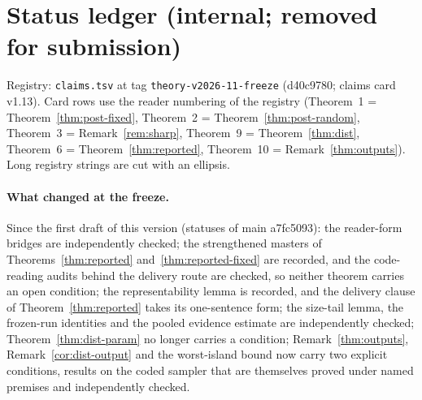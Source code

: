 \ifshowstatus
\section{Status ledger (internal; removed for submission)}\label{app:status}

Registry: \texttt{claims.tsv} at tag \texttt{theory-v2026-11-freeze} (d40c9780; claims card v1.13). Card rows use the
reader numbering of the registry (Theorem~1 = Theorem~\ref{thm:post-fixed}, Theorem~2 = Theorem~\ref{thm:post-random},
Theorem~3 = Remark~\ref{rem:sharp}, Theorem~9 = Theorem~\ref{thm:dist}, Theorem~6 = Theorem~\ref{thm:reported},
Theorem~10 = Remark~\ref{thm:outputs}). Long registry strings are cut with an ellipsis.


\paragraph{What changed at the freeze.} Since the first draft of this version (statuses of main a7fc5093): the
reader-form bridges are independently checked; the strengthened masters of Theorems~\ref{thm:reported}
and~\ref{thm:reported-fixed} are recorded, and the code-reading audits behind the delivery route are checked, so neither
theorem carries an open condition; the representability lemma is recorded, and the delivery clause of
Theorem~\ref{thm:reported} takes its one-sentence form; the size-tail lemma, the frozen-run identities and the pooled
evidence estimate are independently checked; Theorem~\ref{thm:dist-param} no longer carries a condition;
Remark~\ref{thm:outputs}, Remark~\ref{cor:dist-output} and the worst-island bound now carry two explicit conditions,
results on the coded sampler that are themselves proved under named premises and independently checked.

